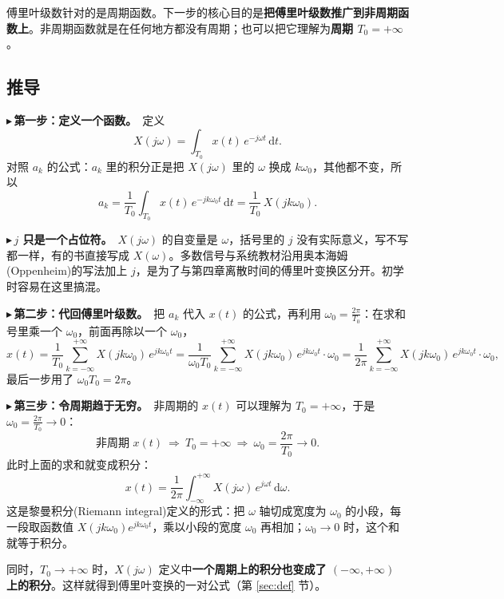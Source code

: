 \documentclass[UTF8,a4paper,11pt]{ctexart}
\newcommand{\dd}{\mathrm{d}}
\newcounter{ex}[section]
\newcommand{\point}[1]{\par\addvspace{1ex}\noindent\textcolor{ptteal}{$\blacktriangleright$\,\textbf{#1}}\ }
\begin{document}
傅里叶级数针对的是周期函数。下一步的核心目的是\textbf{把傅里叶级数推广到非周期函数上}。非周期函数就是在任何地方都没有周期；也可以把它理解为\textbf{周期 $T_0=+\infty$}。

\subsection{推导}
\point{第一步：定义一个函数。}定义
\[
X(j\omega)=\int_{T_0}x(t)\,e^{-j\omega t}\,\dd t .
\]
对照 $a_k$ 的公式：$a_k$ 里的积分正是把 $X(j\omega)$ 里的 $\omega$ 换成 $k\omega_0$，其他都不变，所以
\[
a_k=\frac1{T_0}\int_{T_0}x(t)\,e^{-jk\omega_0t}\,\dd t=\frac1{T_0}\,X(jk\omega_0).
\]

\point{$j$ 只是一个占位符。}$X(j\omega)$ 的自变量是 $\omega$，括号里的 $j$ 没有实际意义，写不写都一样，有的书直接写成 $X(\omega)$。多数信号与系统教材沿用奥本海姆(Oppenheim)的写法加上 $j$，是为了与第四章离散时间的傅里叶变换区分开。初学时容易在这里搞混。

\point{第二步：代回傅里叶级数。}把 $a_k$ 代入 $x(t)$ 的公式，再利用 $\omega_0=\frac{2\pi}{T_0}$：在求和号里乘一个 $\omega_0$，前面再除以一个 $\omega_0$，
\[
x(t)=\frac1{T_0}\sum_{k=-\infty}^{+\infty}X(jk\omega_0)\,e^{jk\omega_0t}
=\frac1{\omega_0T_0}\sum_{k=-\infty}^{+\infty}X(jk\omega_0)\,e^{jk\omega_0t}\cdot\omega_0
=\frac1{2\pi}\sum_{k=-\infty}^{+\infty}X(jk\omega_0)\,e^{jk\omega_0t}\cdot\omega_0 ,
\]
最后一步用了 $\omega_0T_0=2\pi$。

\point{第三步：令周期趋于无穷。}非周期的 $x(t)$ 可以理解为 $T_0=+\infty$，于是 $\omega_0=\frac{2\pi}{T_0}\to0$：
\[
\text{非周期 }x(t)\ \Longrightarrow\ T_0=+\infty\ \Longrightarrow\ \omega_0=\frac{2\pi}{T_0}\to0 .
\]
此时上面的求和就变成积分：
\[
x(t)=\frac1{2\pi}\int_{-\infty}^{+\infty}X(j\omega)\,e^{j\omega t}\,\dd\omega .
\]
这是黎曼积分(Riemann integral)定义的形式：把 $\omega$ 轴切成宽度为 $\omega_0$ 的小段，每一段取函数值 $X(jk\omega_0)e^{jk\omega_0t}$，乘以小段的宽度 $\omega_0$ 再相加；$\omega_0\to0$ 时，这个和就等于积分。

同时，$T_0\to+\infty$ 时，$X(j\omega)$ 定义中\textbf{一个周期上的积分也变成了 $(-\infty,+\infty)$ 上的积分}。这样就得到傅里叶变换的一对公式（第 \ref{sec:def} 节）。
\end{document}
